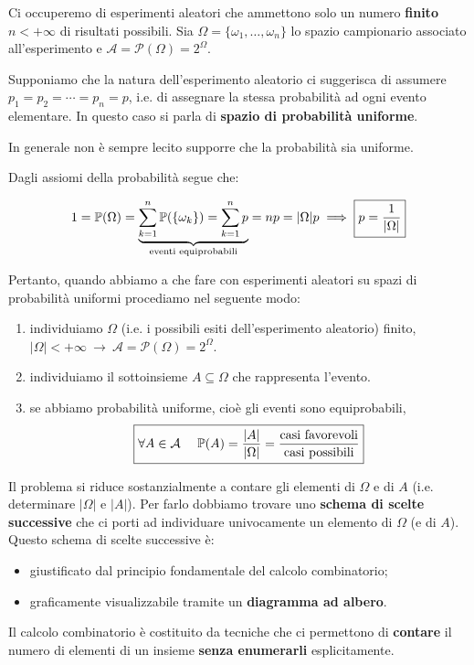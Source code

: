 
\ParteEsercizi

Ci occuperemo di esperimenti aleatori che ammettono solo un numero \textbf{finito} $n< +\infty $ di risultati possibili. Sia $\Omega =\{\omega_{1} ,\dots ,\omega_{n}\}$ lo spazio campionario associato all'esperimento e $\mathcal{A} =\mathcal{P}(\Omega) =2^{\Omega }$.

Supponiamo che la natura dell'esperimento aleatorio ci suggerisca di assumere $p_{1} =p_{2} =\cdots =p_{n} =p$, i.e. di assegnare la stessa probabilità ad ogni evento elementare. In questo caso si parla di \textbf{spazio di probabilità uniforme}.

\begin{oss}
	In generale non è sempre lecito supporre che la probabilità sia uniforme.
\end{oss}

Dagli assiomi della probabilità segue che:

\begin{equation*}
	1=\mathbb{P}(\Omega) =\underbrace{\sum\limits_{k=1}^{n}\mathbb{P}(\{\omega_{k}\}) =\sum\limits_{k=1}^{n} p}_{\text{eventi equiprobabili}} =np=| \Omega | p\implies \boxed{p=\frac{1}{| \Omega | }}
\end{equation*}

Pertanto, quando abbiamo a che fare con esperimenti aleatori su spazi di probabilità uniformi procediamo nel seguente modo:
\begin{enumerate}
	\item individuiamo $\Omega $ (i.e. i possibili esiti dell'esperimento aleatorio) finito, $| \Omega | < +\infty \ \rightarrow \ \mathcal{A} =\mathcal{P}(\Omega) =2^{\Omega }$.
	\item individuiamo il sottoinsieme $A\subseteq \Omega $ che rappresenta l'evento.
	\item se abbiamo probabilità uniforme, cioè gli eventi sono equiprobabili,
	\begin{equation*}
		\boxed{\forall A\in \mathcal{A} \ \ \ \ \mathbb{P}(A) =\frac{| A| }{| \Omega | } =\frac{\text{casi favorevoli}}{\text{casi possibili}}}
	\end{equation*}
\end{enumerate}
Il problema si riduce sostanzialmente a contare gli elementi di $\Omega $ e di $A$ (i.e. determinare $| \Omega | $ e $|A| $). Per farlo dobbiamo trovare uno \textbf{schema di scelte successive} che ci porti ad individuare univocamente un elemento di $\Omega $ (e di $A$). Questo schema di scelte successive è:
\begin{itemize}
	\item giustificato dal principio fondamentale del calcolo combinatorio;
	\item graficamente visualizzabile tramite un \textbf{diagramma ad albero}.
\end{itemize}
Il calcolo combinatorio è costituito da tecniche che ci permettono di \textbf{contare} il numero di elementi di un insieme \textbf{senza enumerarli} esplicitamente.

